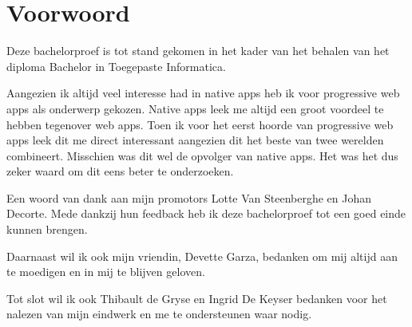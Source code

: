 
\chapter*{Voorwoord}
\label{ch:voorwoord}


Deze bachelorproef is tot stand gekomen in het kader van het behalen van het diploma Bachelor in Toegepaste Informatica.

Aangezien ik altijd veel interesse had in native apps heb ik voor progressive web apps als onderwerp gekozen. Native apps leek me altijd een groot voordeel te hebben tegenover web apps. Toen ik voor het eerst hoorde van progressive web apps leek dit me direct interessant aangezien dit het beste van twee werelden combineert. Misschien was dit wel de opvolger van native apps. Het was het dus zeker waard om dit eens beter te onderzoeken.

Een woord van dank aan mijn promotors Lotte Van Steenberghe en Johan Decorte. Mede dankzij hun feedback heb ik deze bachelorproef tot een goed einde kunnen brengen.

Daarnaast wil ik ook mijn vriendin, Devette Garza, bedanken om mij altijd aan te moedigen en in mij te blijven geloven.

Tot slot wil ik ook Thibault de Gryse en Ingrid De Keyser bedanken voor het nalezen van mijn eindwerk en me te ondersteunen waar nodig.
